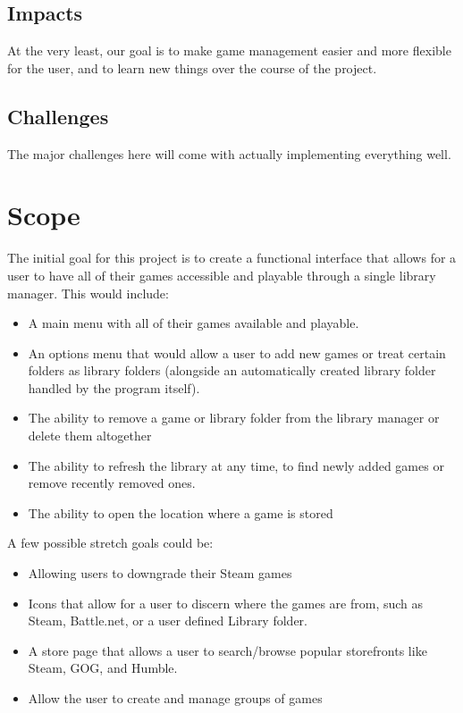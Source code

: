\documentclass[10pt,conference,onecolumn,compsoc]{IEEEtran}
\begin{document}
\subsection{Impacts}
At the very least, our goal is to make game management easier and more flexible for the user, and to learn new things over the course of the project.

\subsection{Challenges}
The major challenges here will come with actually implementing everything well.

\section{Scope}
The initial goal for this project is to create a functional interface that allows for a user to have all of their games accessible and playable through a single library manager. This would include:

\begin{itemize}
\item A main menu with all of their games available and playable.
\item An options menu that would allow a user to add new games or treat certain folders as library folders (alongside an automatically created library folder handled by the program itself).
\item The ability to remove a game or library folder from the library manager or delete them altogether
\item The ability to refresh the library at any time, to find newly added games or remove recently removed ones.
\item The ability to open the location where a game is stored
\end{itemize}

A few possible stretch goals could be:

\begin{itemize}
\item Allowing users to downgrade their Steam games
\item Icons that allow for a user to discern where the games are from, such as Steam, Battle.net, or a user defined Library folder.
\item A store page that allows a user to search/browse popular storefronts like Steam, GOG, and Humble.
\item Allow the user to create and manage groups of games
\end{itemize}
\end{document}
